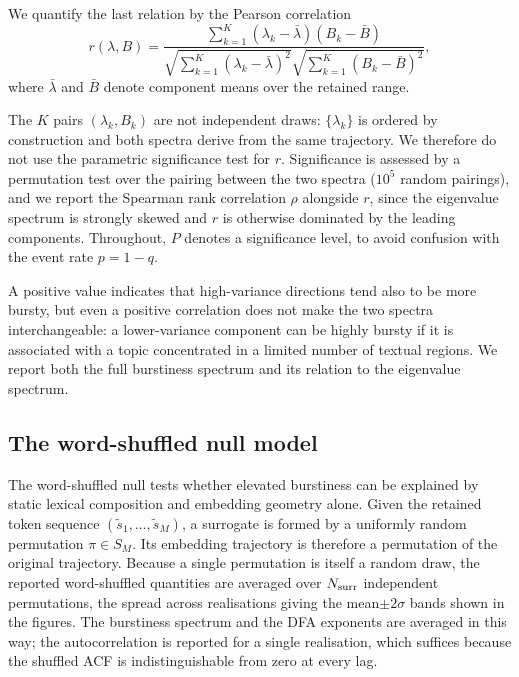 \documentclass[preprint]{elsarticle}
\begin{document}
We quantify the last relation by the Pearson correlation
\begin{equation}
  r(\lambda,B)=
  \frac{\sum_{k=1}^{K}(\lambda_k-\bar\lambda)(B_k-\bar B)}
  {\sqrt{\sum_{k=1}^{K}(\lambda_k-\bar\lambda)^2}
   \sqrt{\sum_{k=1}^{K}(B_k-\bar B)^2}},
  \label{eq:eigen_burst_corr}
\end{equation}
where $\bar\lambda$ and $\bar B$ denote component means over the retained
range.

The $K$ pairs $(\lambda_k,B_k)$ are not independent draws: $\{\lambda_k\}$
is ordered by construction and both spectra derive from the same
trajectory. We therefore do not use the parametric significance test for
$r$. Significance is assessed by a permutation test over the pairing
between the two spectra ($10^5$ random pairings), and we report the
Spearman rank correlation $\rho$ alongside $r$, since the eigenvalue
spectrum is strongly skewed and $r$ is otherwise dominated by the leading
components. Throughout, $P$ denotes a significance level, to avoid confusion with
the event rate $p=1-q$.


A positive value indicates that high-variance directions tend also to
be more bursty, but even a positive correlation does not make the two spectra interchangeable:
a lower-variance component can be highly bursty if it is
associated with a topic concentrated in a limited number of textual
regions.
We report both the full burstiness spectrum and its relation to the eigenvalue spectrum.

\subsection{The word-shuffled null model}
\label{sec:null_model_shuffle}

The word-shuffled null tests whether elevated burstiness can be
explained by static lexical composition and embedding geometry alone.
Given the retained token sequence $(\tilde s_1,\ldots,\tilde s_M)$, a
surrogate is formed by a uniformly random permutation
$\pi\in S_M$.
Its embedding trajectory is therefore a permutation of the original
trajectory. Because a single permutation is itself a random draw, the reported
word-shuffled quantities are averaged over $N_{\rm surr}$ independent
permutations, the spread across realisations giving the mean$\pm2\sigma$
bands shown in the figures. The burstiness spectrum and the DFA
exponents are averaged in this way; the autocorrelation is reported for
a single realisation, which suffices because the shuffled ACF is
indistinguishable from zero at every lag.
\end{document}

